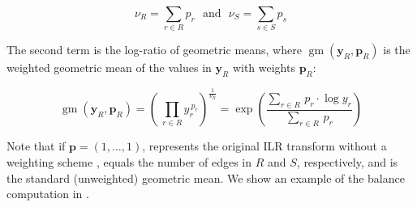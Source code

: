 \begin{equation}
    \label{ch:Balances:sec:Methods:eq:WeightSums}
    \nu_R = \sum_{r \in R} p_r  ~~~\mbox{and}~~~  \nu_S = \sum_{s \in S} p_s
\end{equation}

The second term is the log-ratio of geometric means, where $\operatorname{gm}( \bm{y}_R, \bm{p}_R )$
is the weighted geometric mean of the values in $\bm{y}_R$ with weights $\bm{p}_R$:

\begin{equation}
    \label{ch:Balances:sec:Methods:eq:GeometricMean}
    \operatorname{gm}( \bm{y}_R, \bm{p}_R )
    = \left(~ \prod_{r \in R} y_r ^ {~p_r} \right) ^ { \frac{1}{ \nu_R } }
    = \exp \left( \frac{ \sum_{r \in R} \, p_r \cdot \log y_r }{ \sum_{r \in R} \, p_r } \right)
\end{equation}

Note that if $\bm{p} = ( 1, \ldots, 1 )$, %
represents the original ILR transform without a weighting scheme \cite{Egozcue2003},
 equals the number of edges in $R$ and $S$, respectively,
and  is the standard (unweighted) geometric mean.
We show an example of the balance computation in .

